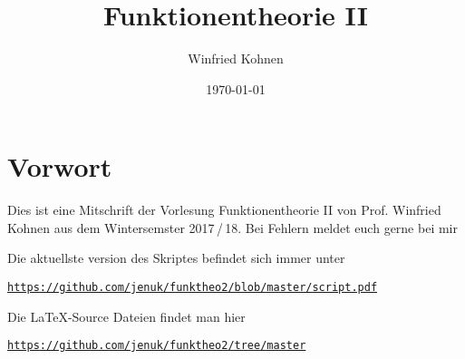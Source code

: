 \documentclass[]{scrbook}
\title{Funktionentheorie II}
\author{Winfried Kohnen}
\date{\today}
\begin{document}
\pagestyle{plain}

\maketitle

\chapter*{Vorwort}

Dies ist eine Mitschrift der Vorlesung Funktionentheorie II von Prof. Winfried Kohnen aus dem Wintersemster 2017\,/\,18.
Bei Fehlern meldet euch gerne bei mir

\begin{center}
\end{center}

Die aktuellste version des Skriptes befindet sich immer unter
\begin{center}
\texttt{\url{https://github.com/jenuk/funktheo2/blob/master/script.pdf}}
\end{center}

Die \LaTeX-Source Dateien findet man hier
\begin{center}
\texttt{\url{https://github.com/jenuk/funktheo2/tree/master}}
\end{center}

\tableofcontents
\clearpage

\setcounter{page}{0}
\pagestyle{fancy}








\begin{appendices}


\printindex
\end{appendices}
\end{document}
